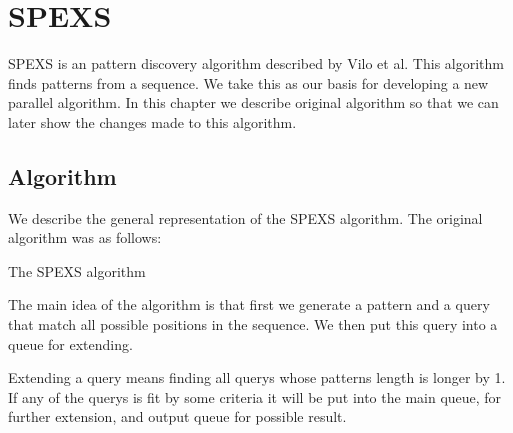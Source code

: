 \chapter{SPEXS}

SPEXS is an pattern discovery algorithm described by Vilo et al.
This algorithm finds patterns from a sequence.
We take this as our basis for developing a new parallel algorithm.
In this chapter we describe original algorithm so that we can
later show the changes made to this algorithm.

\section{Algorithm}

We describe the general representation of the SPEXS algorithm. 
The original algorithm was as follows:


\begin{algorithm}[H]
	\caption{The SPEXS algorithm}
\begin{algorithmic}[1]



				\EndIf
			\EndIf
		\EndFor
	\EndWhile
\end{algorithmic}
\end{algorithm}

The main idea of the algorithm is that first we generate a 
pattern and a query that match all possible positions in 
the sequence. We then put this query into a queue for extending.

Extending a query means finding all querys whose patterns length
is longer by 1. If any of the querys is fit by some criteria
it will be put into the main queue, for further extension, 
and output queue for possible result.